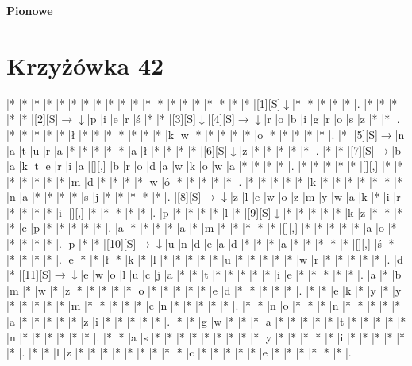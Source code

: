 \documentclass[11pt]{article}
\newcommand\drarr{$\rightarrow \!\!\!\!\! \downarrow$}
\newcommand\rarr{$\rightarrow$}
\newcommand\darr{$\downarrow$}
\begin{document}
\begin{PuzzleClues}{\textbf{Pionowe}\\}
\end{PuzzleClues}\newpage\section*{Krzyżówka 42}

\noindent\begin{Puzzle}{25}{27}|*	|*	|*	|*	|*	|*	|*	|*	|*	|*	|*	|*	|*	|*	|*	|*	|*	|*	|*	|*	|[1][S]\darr	|*	|*	|*	|*	|*	|.
|*	|*	|*	|*	|*	|[2][S]\drarr	|p	|i	|e	|r	|ś	|*	|*	|[3][S]\darr	|[4][S]\drarr	|r	|o	|b	|i	|g	|r	|o	|s	|z	|*	|*	|.
|*	|*	|*	|*	|*	|ł	|*	|*	|*	|*	|*	|*	|*	|k	|w	|*	|*	|*	|*	|*	|o	|*	|*	|*	|*	|*	|.
|*	|[5][S]\rarr	|n	|a	|t	|u	|r	|a	|*	|*	|*	|*	|*	|a	|ł	|*	|*	|*	|*	|[6][S]\darr	|z	|*	|*	|*	|*	|*	|.
|*	|*	|[7][S]\rarr	|b	|a	|k	|t	|e	|r	|i	|a	|[][,]{ }	|b	|r	|o	|d	|a	|w	|k	|o	|w	|a	|*	|*	|*	|*	|.
|*	|*	|*	|*	|*	|[][,]{ }	|*	|*	|*	|*	|*	|*	|*	|m	|d	|*	|*	|*	|*	|w	|ó	|*	|*	|*	|*	|*	|.
|*	|*	|*	|*	|*	|k	|*	|*	|*	|*	|*	|*	|*	|n	|a	|*	|*	|*	|*	|s	|j	|*	|*	|*	|*	|*	|.
|[8][S]\drarr	|z	|l	|e	|w	|o	|z	|m	|y	|w	|a	|k	|*	|i	|r	|*	|*	|*	|*	|i	|[][,]{ }	|*	|*	|*	|*	|*	|.
|p	|*	|*	|*	|*	|l	|*	|[9][S]\darr	|*	|*	|*	|*	|*	|k	|z	|*	|*	|*	|*	|c	|p	|*	|*	|*	|*	|*	|.
|a	|*	|*	|*	|*	|a	|*	|m	|*	|*	|*	|*	|*	|[][,]{ }	|*	|*	|*	|*	|*	|a	|o	|*	|*	|*	|*	|*	|.
|p	|*	|*	|[10][S]\drarr	|u	|n	|d	|e	|a	|d	|*	|*	|*	|a	|*	|*	|*	|*	|*	|[][,]{ }	|ś	|*	|*	|*	|*	|*	|.
|e	|*	|*	|ł	|*	|k	|*	|l	|*	|*	|*	|*	|*	|u	|*	|*	|*	|*	|*	|w	|r	|*	|*	|*	|*	|*	|.
|d	|*	|[11][S]\drarr	|e	|w	|o	|l	|u	|c	|j	|a	|*	|*	|t	|*	|*	|*	|*	|*	|i	|e	|*	|*	|*	|*	|*	|.
|a	|*	|b	|m	|*	|w	|*	|z	|*	|*	|*	|*	|*	|o	|*	|*	|*	|*	|*	|e	|d	|*	|*	|*	|*	|*	|.
|*	|*	|e	|k	|*	|y	|*	|y	|*	|*	|*	|*	|*	|m	|*	|*	|*	|*	|*	|c	|n	|*	|*	|*	|*	|*	|.
|*	|*	|n	|o	|*	|*	|*	|n	|*	|*	|*	|*	|*	|a	|*	|*	|*	|*	|*	|z	|i	|*	|*	|*	|*	|*	|.
|*	|*	|g	|w	|*	|*	|*	|a	|*	|*	|*	|*	|*	|t	|*	|*	|*	|*	|*	|n	|*	|*	|*	|*	|*	|*	|.
|*	|*	|a	|s	|*	|*	|*	|*	|*	|*	|*	|*	|*	|y	|*	|*	|*	|*	|*	|i	|*	|*	|*	|*	|*	|*	|.
|*	|*	|l	|z	|*	|*	|*	|*	|*	|*	|*	|*	|*	|c	|*	|*	|*	|*	|*	|e	|*	|*	|*	|*	|*	|*	|.

\end{Puzzle}
\end{document}
